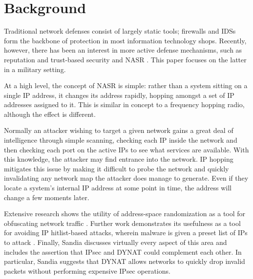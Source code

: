 \section{Background}
\par Traditional network defenses consist of largely static tools; firewalls and \acp{IDS} form the backbone of protection in most information technology shops.  Recently, however, there has been an interest in more active defense mechanisms, such as reputation and trust-based security \cite{Untrustworthiness} and \ac{NASR} \cite{APOD, NAH}. This paper focuses on the latter in a military setting.

\par At a high level, the concept of \ac{NASR} is simple: rather than a system sitting on a single \ac{IP} address, it changes its address rapidly, hopping amongst a set of \ac{IP} addresses assigned to it. This is similar in concept to a frequency hopping radio, although the effect is different. 

\par Normally an attacker wishing to target a given network gains a great deal of intelligence through simple scanning, checking each \ac{IP} inside the network and then checking each port on the active \acp{IP} to see what services are available. With this knowledge, the attacker may find entrance into the network. \ac{IP} hopping mitigates this issue by making it difficult to probe the network \cite{BBNDYNAT} and quickly invalidating any network map the attacker does manage to generate. Even if they locate a system's internal \ac{IP} address at some point in time, the address will change a few moments later.

\par Extensive research shows the utility of address-space randomization as a tool for obfuscating network traffic \cite{BBNDYNAT, NAH, TAO}. Further work demonstrates its usefulness as a tool for avoiding \ac{IP} hitlist-based attacks, wherein malware is given a preset list of \acp{IP} to attack \cite{NASR}. Finally, Sandia discusses virtually every aspect of this area \cite{SandiaDynat} and includes the assertion that \ac{IPsec} and \ac{DYNAT} could complement each other. In particular, Sandia suggests that \ac{DYNAT} allows networks to quickly drop invalid packets without performing expensive \ac{IPsec} operations.


